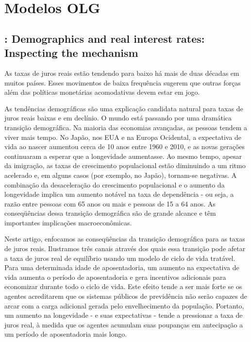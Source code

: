 \chapter{Modelos OLG}

\section{\citet{Ferrero:2016}: Demographics and real interest rates: Inspecting the mechanism}

As taxas de juros reais estão tendendo para baixo há mais de duas décadas em muitos países. Esses movimentos de baixa frequência sugerem que outras forças além das políticas monetárias acomodativas devem estar em jogo.

As tendências demográficas são uma explicação candidata natural para taxas de juros reais baixas e em declínio. O mundo está passando por uma dramática transição demográfica. Na maioria das economias avançadas, as pessoas tendem a viver mais tempo. No Japão, nos EUA e na Europa Ocidental, a expectativa de vida ao nascer aumentou cerca de 10 anos entre 1960 e 2010, e as novas gerações continuaram a esperar que a longevidade aumentasse. Ao mesmo tempo, apesar da imigração, as taxas de crescimento populacional estão diminuindo a um ritmo acelerado e, em alguns casos (por exemplo, no Japão), tornam-se negativas. A combinação da desaceleração do crescimento populacional e o aumento da longevidade implica um aumento notável na taxa de dependência - ou seja, a razão entre pessoas com 65 anos ou mais e pessoas de 15 a 64 anos. As conseqüências dessa transição demográfica são de grande alcance e têm importantes implicações macroeconômicas.

Neste artigo, enfocamos as conseqüências da transição demográfica para as taxas de juros reais. Ilustramos três canais através dos quais essa transição pode afetar a taxa de juros real de equilíbrio usando um modelo de ciclo de vida tratável. Para uma determinada idade de aposentadoria, um aumento na expectativa de vida aumenta o período de aposentadoria e gera incentivos adicionais para economizar durante todo o ciclo de vida. Este efeito tende a ser mais forte se os agentes acreditarem que os sistemas públicos de previdência não serão capazes de arcar com a carga adicional gerada pelo envelhecimento da população. Portanto, um aumento na longevidade - e suas expectativas - tende a pressionar a taxa de juros real, à medida que os agentes acumulam suas poupanças em antecipação a um período de aposentadoria mais longo.

